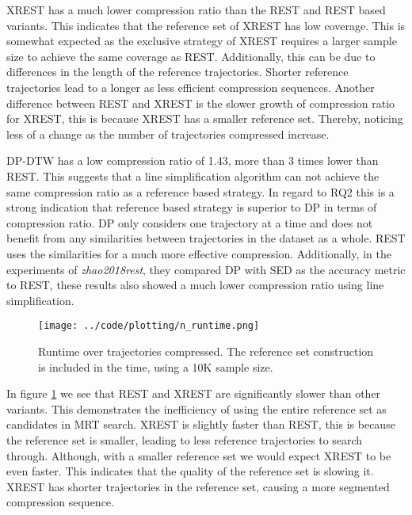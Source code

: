 XREST has a much lower compression ratio than the REST and REST based variants. This indicates that the reference set of XREST has low coverage. This is somewhat expected as the exclusive strategy of XREST requires a larger sample size to achieve the same coverage as REST. Additionally, this can be due to differences in the length of the reference trajectories. Shorter reference trajectories lead to a longer as less efficient compression sequences. Another difference between REST and XREST is the slower growth of compression ratio for XREST, this is because XREST has a smaller reference set. Thereby, noticing less of a change as the number of trajectories compressed increase.

DP-DTW has a low compression ratio of 1.43, more than 3 times lower than REST. This suggests that a line simplification algorithm can not achieve the same compression ratio as a reference based strategy. In regard to RQ2 this is a strong indication that reference based strategy is superior to DP in terms of compression ratio. DP only considers one trajectory at a time and does not benefit from any similarities between trajectories in the dataset as a whole. REST uses the similarities for a much more effective compression. Additionally, in the experiments of \textit{zhao2018rest}, they compared DP with SED as the accuracy metric to REST, these results also showed a much lower compression ratio using line simplification.

\begin{figure}[h]
    \begin{minipage}{0.99\linewidth}
        \centering
        \texttt{[image: ../code/plotting/n\_runtime.png]}
        \caption{Runtime over trajectories compressed. The reference set construction is included in the time, using a 10K sample size.}
        \label{fig:n_runtime}
    \end{minipage}
\end{figure}

In figure \ref{fig:n_runtime} we see that REST and XREST are significantly slower than other variants. This demonstrates the inefficiency of using the entire reference set as candidates in MRT search. XREST is slightly faster than REST, this is because the reference set is smaller, leading to less reference trajectories to search through. Although, with a smaller reference set we would expect XREST to be even faster. This indicates that the quality of the reference set is slowing it. XREST has shorter trajectories in the reference set, causing a more segmented compression sequence.

